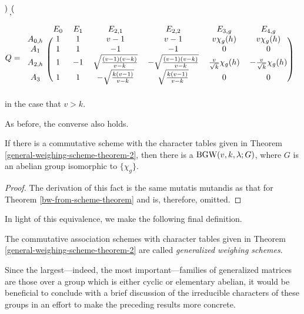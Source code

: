 \documentclass[../../../main]{subfiles}
\begin{document}
\begin{thm}
\begin{align*}
\begin{blockarray}{ccccc}
\begin{block}{c(cccc)}
   \end{block}
  \end{blockarray}, \\
  Q &= 
  \begin{blockarray}{ccccccc}
   & E_0 & E_1 & E_{2,1} & E_{2,2} & E_{3,g} & E_{4,g} \\
   \begin{block}{c(cccccc)}
    A_{0,h} & 1 & 1 & v-1 & v-1 & v\chi_g(h) & v\chi_g(h) \\
    A_1 & 1 & 1 & -1 & -1 & 0 & 0 \\
    A_{2,h} & 1 & -1 & \sqrt{\frac{(v-1)(v-k)}{v-k}} & -\sqrt{\frac{(v-1)(v-k)}{v-k}} & \frac{v}{\sqrt{k}}\chi_g(h) & -\frac{v}{\sqrt{k}}\chi_g(h) \\
    A_3 & 1 & 1 & -\sqrt{\frac{k(v-1)}{v-k}} & \sqrt{\frac{k(v-1)}{v-k}} & 0 & 0 \\
   \end{block}
  \end{blockarray}
 \end{align*}
 in the case that $v>k$.
\end{thm}

As before, the converse also holds.

\begin{thm}
 If there is a commutative scheme with the character tables given in Theorem \ref{general-weighing-scheme-theorem-2}, then there is a $\text{BGW}(v,k,\lambda; G)$, where $G$ is an abelian group isomorphic to $\{\chi_g\}$.
\end{thm}

\begin{proof}
 The derivation of this fact is the same mutatis mutandis as that for Theorem \ref{bw-from-scheme-theorem} and is, therefore, omitted.
\end{proof}

In light of this equivalence, we make the following final definition.

\begin{defin}
 The commutative association schemes with character tables given in Theorem
 \ref{general-weighing-scheme-theorem-2} are called {\it generalized weighing
   schemes}. 
\end{defin}

Since the largest---indeed, the most important---families of generalized
matrices are those over a group which is either cyclic or elementary abelian, it
would be beneficial to conclude with a brief discussion of the irreducible
characters of these groups in an effort to make the preceding results more
concrete.  
\end{document}
